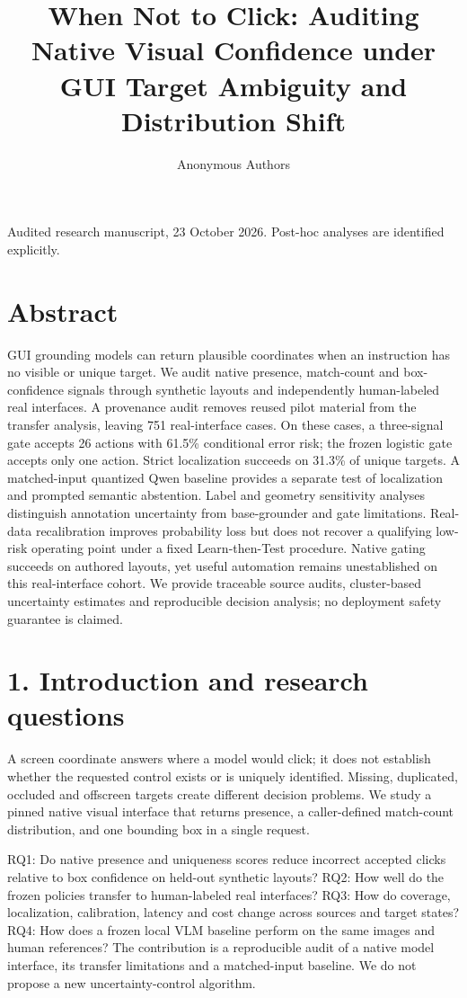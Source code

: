 \documentclass[10pt]{article}
\title{\textbf{When Not to Click: Auditing Native Visual Confidence under GUI Target Ambiguity and Distribution Shift}}
\author{Anonymous Authors}
\date{}
\begin{document}
\maketitle
\begin{center}\small Audited research manuscript, 23 October 2026. Post-hoc analyses are identified explicitly.\end{center}
\section*{Abstract}
GUI grounding models can return plausible coordinates when an instruction has no visible or unique target. We audit native presence, match-count and box-confidence signals through synthetic layouts and independently human-labeled real interfaces. A provenance audit removes reused pilot material from the transfer analysis, leaving 751 real-interface cases. On these cases, a three-signal gate accepts 26 actions with 61.5\% conditional error risk; the frozen logistic gate accepts only one action. Strict localization succeeds on 31.3\% of unique targets. A matched-input quantized Qwen baseline provides a separate test of localization and prompted semantic abstention. Label and geometry sensitivity analyses distinguish annotation uncertainty from base-grounder and gate limitations. Real-data recalibration improves probability loss but does not recover a qualifying low-risk operating point under a fixed Learn-then-Test procedure. Native gating succeeds on authored layouts, yet useful automation remains unestablished on this real-interface cohort. We provide traceable source audits, cluster-based uncertainty estimates and reproducible decision analysis; no deployment safety guarantee is claimed.

\section*{1. Introduction and research questions}
A screen coordinate answers where a model would click; it does not establish whether the requested control exists or is uniquely identified. Missing, duplicated, occluded and offscreen targets create different decision problems. We study a pinned native visual interface that returns presence, a caller-defined match-count distribution, and one bounding box in a single request.

RQ1: Do native presence and uniqueness scores reduce incorrect accepted clicks relative to box confidence on held-out synthetic layouts? RQ2: How well do the frozen policies transfer to human-labeled real interfaces? RQ3: How do coverage, localization, calibration, latency and cost change across sources and target states? RQ4: How does a frozen local VLM baseline perform on the same images and human references? The contribution is a reproducible audit of a native model interface, its transfer limitations and a matched-input baseline. We do not propose a new uncertainty-control algorithm.
\end{document}
